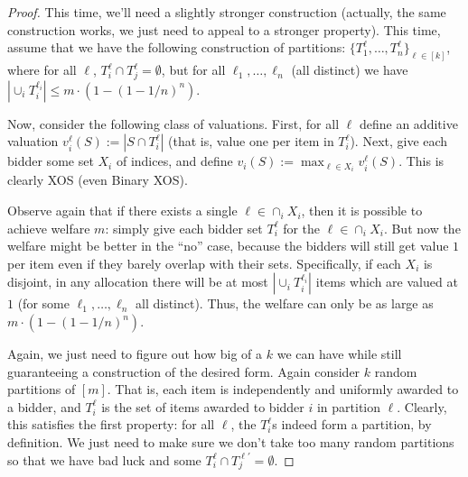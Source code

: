   \begin{proof} This time, we'll need a slightly stronger construction (actually,
    the same construction works, we just need to appeal to a stronger property).
    This time, assume that we have the following construction of partitions:
    $\{T_1^\ell,\ldots, T_n^\ell\}_{\ell \in [k]}$, where for all $\ell$,
    $T_i^\ell \cap T_j^\ell = \emptyset$, but for all $\ell_1,\ldots, \ell_n$ (all
    distinct) we have $|\cup_i T_i^{\ell_i}| \leq m\cdot (1-(1-1/n)^n)$. 

  Now, consider the following class of valuations. First, for all $\ell$ define an
  additive valuation $v_i^\ell(S) := |S \cap T_i^\ell|$ (that is, value one per
  item in $T_i^\ell$). Next, give each bidder some set $X_i$ of indices, and
  define $v_i(S) := \max_{\ell \in X_i} v_i^\ell(S)$. This is clearly XOS (even
  Binary XOS). 

  Observe again that if there exists a single $\ell \in \cap_i X_i$, then it is
  possible to achieve welfare $m$: simply give each bidder set $T_i^\ell$ for the
  $\ell \in \cap_i X_i$. But now the welfare might be better in the ``no'' case,
  because the bidders will still get value $1$ per item even if they barely
  overlap with their sets. Specifically, if each $X_i$ is disjoint,
  in any allocation there will be at most
  $|\cup_i T_i^{\ell_i}|$ items which are valued at $1$
  (for some $\ell_1,\ldots, \ell_n$ all distinct).
  Thus, the welfare can only be as large as 
  $m \cdot (1-(1-1/n)^n)$.

  Again, we just need to figure out how big of a $k$ we can have while still
  guaranteeing a construction of the desired form. Again consider $k$ random
  partitions of $[m]$. That is, each item is independently and uniformly awarded
  to a bidder, and $T_i^\ell$ is the set of items awarded to bidder $i$ in
  partition $\ell$. Clearly, this satisfies the first property: for all $\ell$,
  the $T_i^\ell$s indeed form a partition, by definition. We just need to make
  sure we don't take too many random partitions so that we have bad luck and some
  $T_i^\ell \cap T_j^{\ell'}= \emptyset$. 


\end{proof}

